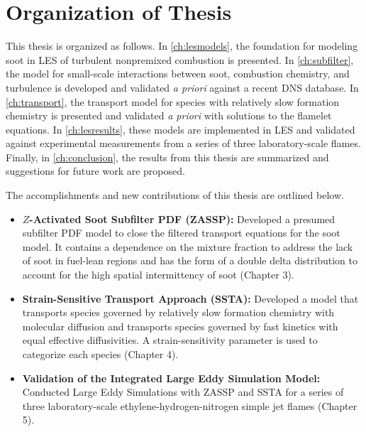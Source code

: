 \section{Organization of Thesis}
\label{sec:intro:org}

This thesis is organized as follows. In \cref{ch:lesmodels}, the foundation for modeling soot in LES of turbulent nonpremixed combustion is presented. In \cref{ch:subfilter}, the model for small-scale interactions between soot, combustion chemistry, and turbulence is developed and validated \textit{a priori} against a recent DNS database. In \cref{ch:transport}, the transport model for species with relatively slow formation chemistry is presented and validated \textit{a priori} with solutions to the flamelet equations. In \cref{ch:lesresults}, these models are implemented in LES and validated against experimental measurements from a series of three laboratory-scale flames. Finally, in \cref{ch:conclusion}, the results from this thesis are summarized and suggestions for future work are proposed.

The accomplishments and new contributions of this thesis are outlined below.
\begin{itemize}
\item \textbf{$Z$-Activated Soot Subfilter PDF (ZASSP):} Developed a presumed subfilter PDF model to close the filtered transport equations for the soot model. It contains a dependence on the mixture fraction to address the lack of soot in fuel-lean regions and has the form of a double delta distribution to account for the high spatial intermittency of soot (Chapter 3).
\item \textbf{Strain-Sensitive Transport Approach (SSTA):} Developed a model that transports species governed by relatively slow formation chemistry with molecular diffusion and transports species governed by fast kinetics with equal effective diffusivities. A strain-sensitivity parameter is used to categorize each species (Chapter 4).
\item \textbf{Validation of the Integrated Large Eddy Simulation Model:} Conducted Large Eddy Simulations with ZASSP and SSTA for a series of three laboratory-scale ethylene-hydrogen-nitrogen simple jet flames (Chapter 5).
\end{itemize}
